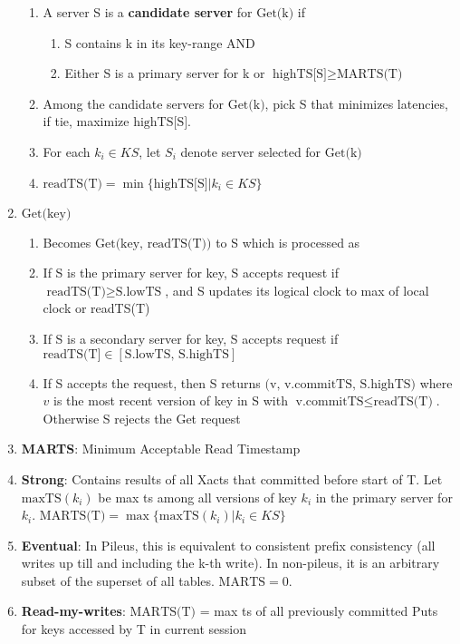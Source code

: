 \documentclass[8pt, landscape]{extarticle}
\begin{document}
\begin{multicols*}{4}
\begin{enumerate}
\begin{enumerate}
        \item A server S is a \textbf{candidate server} for $\text{Get(k)}$ if
        \begin{enumerate}
            \item S contains k in its key-range AND
            \item Either S is a primary server for k or $\text{highTS[S]}\geq \text{MARTS(T)}$
        \end{enumerate}
        \item Among the candidate servers for $\text{Get(k)}$, pick S that minimizes latencies, if tie, maximize $\text{highTS[S]}$.
        \item For each $k_i \in KS$, let $S_i$ denote server selected for $\text{Get(k)}$
        \item $\text{readTS(T)} = \min\lbrace \text{highTS[S]} | k_i \in KS\rbrace$
    \end{enumerate}
    \item $\text{Get(key)}$
    \begin{enumerate}
        \item Becomes $\text{Get(key, readTS(T))}$ to S which is processed as
        \item If S is the primary server for key, S accepts request if $\text{readTS(T)}\ge \text{S.lowTS}$, and S updates its logical clock to max of local clock or readTS(T)
        \item If S is a secondary server for key, S accepts request if $\text{readTS(T]} \in {[\text{S.lowTS, S.highTS}]}$
        \item If S accepts the request, then S returns $\text{(v, v.commitTS, S.highTS)}$ where $v$ is the most recent version of key in S with $\text{v.commitTS} \leq \text{readTS(T)}$. Otherwise S rejects the Get request
    \end{enumerate}
    \item \textbf{MARTS}: Minimum Acceptable Read Timestamp
    \item \textbf{Strong}: Contains results of all Xacts that committed before start of T. Let $\text{maxTS}(k_i)$ be max ts among all versions of key $k_i$ in the primary server for $k_i$. $\text{MARTS(T)}=\max\lbrace \text{maxTS}(k_i)|k_i\in KS\rbrace$
    \item \textbf{Eventual}: In Pileus, this is equivalent to consistent prefix consistency (all writes up till and including the k-th write). In non-pileus, it is an arbitrary subset of the superset of all tables. $\text{MARTS}=0$.
    \item \textbf{Read-my-writes}: $\text{MARTS(T)}$ = max ts of all previously committed Puts for keys accessed by T in current session

\end{enumerate}
\end{multicols*}
\end{document}
